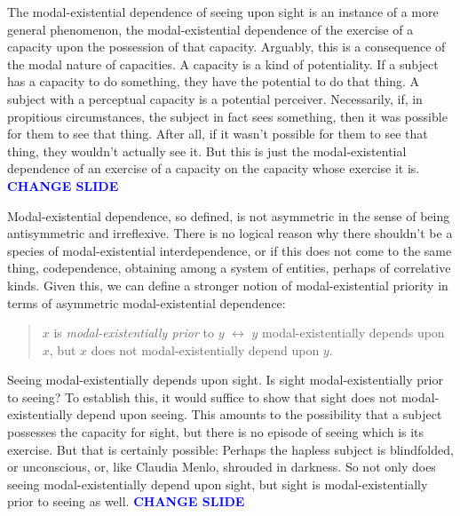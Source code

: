 \documentclass[12pt]{article}
\newcommand{\change}{\textcolor{blue}{\textbf{CHANGE SLIDE}}}
\begin{document}
The modal-existential dependence of seeing upon sight is an instance of a more general phenomenon, the modal-existential dependence of the exercise of a capacity upon the possession of that capacity. Arguably, this is a consequence of the modal nature of capacities. A capacity is a kind of potentiality. If a subject has a capacity to do something, they have the potential to do that thing. A subject with a perceptual capacity is a potential perceiver. Necessarily, if, in propitious circumstances, the subject in fact sees something, then it was possible for them to see that thing. After all, if it wasn't possible for them to see that thing, they wouldn't actually see it. But this is just the modal-existential dependence of an exercise of a capacity on the capacity whose exercise it is. \change

Modal-existential dependence, so defined, is not asymmetric in the sense of being antisymmetric and irreflexive. There is no logical reason why there shouldn't be a species of modal-existential interdependence, or if this does not come to the same thing, codependence, obtaining among a system of entities, perhaps of correlative kinds. Given this, we can define a stronger notion of modal-existential priority in terms of asymmetric modal-existential dependence:
\begin{quote}
    \( x \) is \emph{modal-existentially prior} to \( y \) \( \leftrightarrow \) \( y \) modal-existentially depends upon \( x \), but \( x \) does not modal-existentially depend upon \( y \).
\end{quote}
Seeing modal-existentially depends upon sight. Is sight modal-existentially prior to seeing? To establish this, it would suffice to show that sight does not modal-existentially depend upon seeing. This amounts to the possibility that a subject possesses the capacity for sight, but there is no episode of seeing which is its exercise. But that is certainly possible: Perhaps the hapless subject is blindfolded, or unconscious, or, like Claudia Menlo, shrouded in darkness. So not only does seeing modal-existentially depend upon sight, but sight is modal-existentially prior to seeing as well. \change
\end{document}
